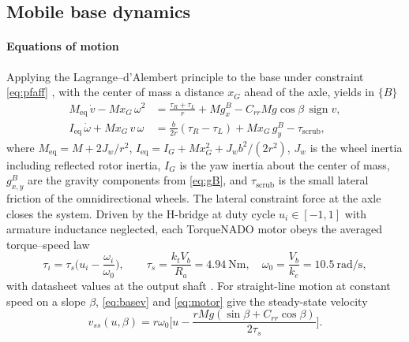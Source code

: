 \subsection{Mobile base dynamics}
\label{sec:basedyn}

\paragraph{Equations of motion}
Applying the Lagrange--d'Alembert principle to the base under constraint \eqref{eq:pfaff} \cite{fierro1997,siciliano2009}, with the center of mass a distance $x_G$ ahead of the axle, yields in $\{B\}$
\begin{align}
  M_{\mathrm{eq}}\,\dot v-M x_G\,\omega^2&=\frac{\tau_R+\tau_L}{r}+M g^{B}_x-C_{rr}Mg\cos\beta\,\operatorname{sign}v, \label{eq:basev}\\
  I_{\mathrm{eq}}\,\dot\omega+M x_G\,v\,\omega&=\frac{b}{2r}(\tau_R-\tau_L)+M x_G\,g^{B}_y-\tau_{\mathrm{scrub}}, \label{eq:basew}
\end{align}
where $M_{\mathrm{eq}}=M+2J_w/r^2$, $I_{\mathrm{eq}}=I_G+Mx_G^2+J_wb^2/(2r^2)$, $J_w$ is the wheel inertia including reflected rotor inertia, $I_G$ is the yaw inertia about the center of mass, $g^{B}_{x,y}$ are the gravity components from \eqref{eq:gB}, and $\tau_{\mathrm{scrub}}$ is the small lateral friction of the omnidirectional wheels. The lateral constraint force at the axle closes the system. Driven by the H-bridge at duty cycle $u_i\in[-1,1]$ with armature inductance neglected, each TorqueNADO motor obeys the averaged torque--speed law
\begin{equation}
  \tau_i=\tau_s\Big(u_i-\frac{\omega_i}{\omega_0}\Big),\qquad \tau_s=\frac{k_tV_b}{R_a}=\SI{4.94}{\newton\metre},\quad \omega_0=\frac{V_b}{k_e}=\SI{10.5}{\radian\per\second},
  \label{eq:motor}
\end{equation}
with datasheet values at the output shaft \cite{pitsco_torquenado}. For straight-line motion at constant speed on a slope $\beta$, \eqref{eq:basev} and \eqref{eq:motor} give the steady-state velocity
\begin{equation}
  v_{ss}(u,\beta)=r\omega_0\Big[u-\frac{rMg(\sin\beta+C_{rr}\cos\beta)}{2\tau_s}\Big].
  \label{eq:vss}
\end{equation}
